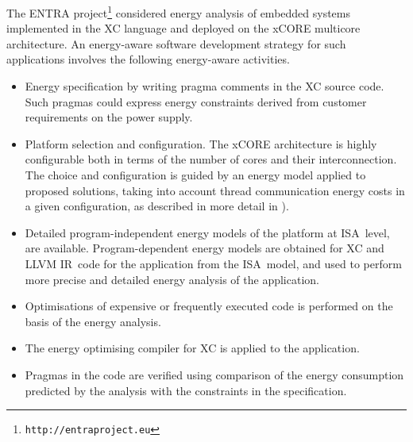 \documentclass[oneside]{book}
\newcommand{\llvmir}{LLVM IR\xspace}
\newcommand{\isa}{ISA\xspace}
\begin{document}
The ENTRA project\footnote{\texttt{http://entraproject.eu}} considered energy analysis of embedded systems implemented in the XC language and deployed on the xCORE multicore architecture.  An energy-aware software development strategy for such applications involves the following energy-aware activities.
\begin{itemize}
\item
Energy specification by writing pragma comments in the XC source code.  Such pragmas could express energy constraints derived from customer requirements on the power supply.
\item
Platform selection and configuration.  The xCORE architecture is highly configurable both in terms of the number of cores and their interconnection.  The choice and configuration is guided by an energy model applied to proposed solutions, taking into account thread communication energy costs in a given configuration, as described in more detail in \cite{KerrisonSwallow15}).
\item
Detailed program-independent energy models of the platform at \isa\ level, are available.  
Program-dependent energy models are obtained for XC and \llvmir\ code for the application from the \isa\ model, and used to perform more precise and detailed energy analysis of the application.
\item
Optimisations of expensive or frequently executed code is performed on the basis of the energy analysis.
\item
The energy optimising compiler for XC is applied to the application.
\item
Pragmas in the code are verified using comparison of the energy consumption predicted by the analysis with the constraints in the specification.  

\end{itemize}
\end{document}
